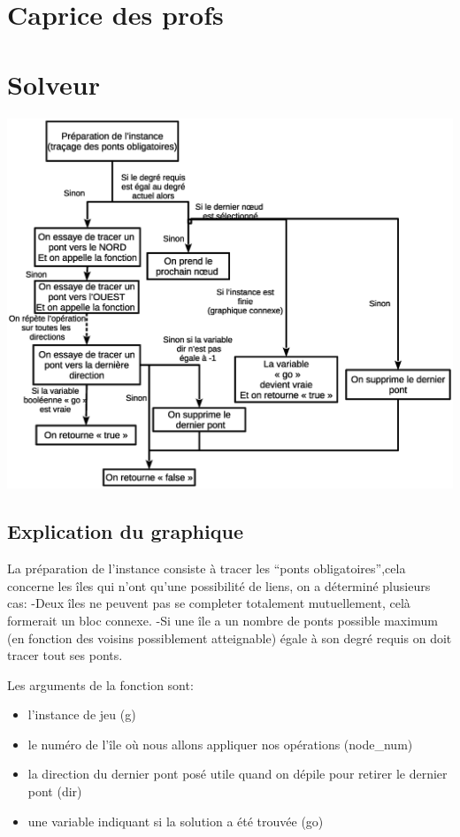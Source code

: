 \documentclass[12pt]{report}
\begin{document}
\chapter{Caprice des profs}

\chapter{Solveur}
\includegraphics[width = 1.00\textwidth]{explication_solveur.eps}
\section{Explication du graphique}
La préparation de l'instance consiste à tracer les ``ponts obligatoires'',cela concerne les îles qui n'ont qu'une possibilité de liens,
on a déterminé plusieurs cas:\newline
-Deux îles ne peuvent pas se completer totalement mutuellement, celà formerait un bloc connexe.\newline
-Si une île a un nombre de ponts possible maximum (en fonction des voisins possiblement atteignable) égale à son degré requis on doit tracer tout ses ponts.\newline

Les arguments de la fonction sont:
\begin{itemize}
\item l'instance de jeu (g)
\item le numéro de l'île où nous allons appliquer nos opérations (node\_num)
\item la direction du dernier pont posé utile quand on dépile pour retirer le dernier pont (dir)
\item une variable indiquant si la solution a été trouvée (go)
\end{itemize}
\end{document}
